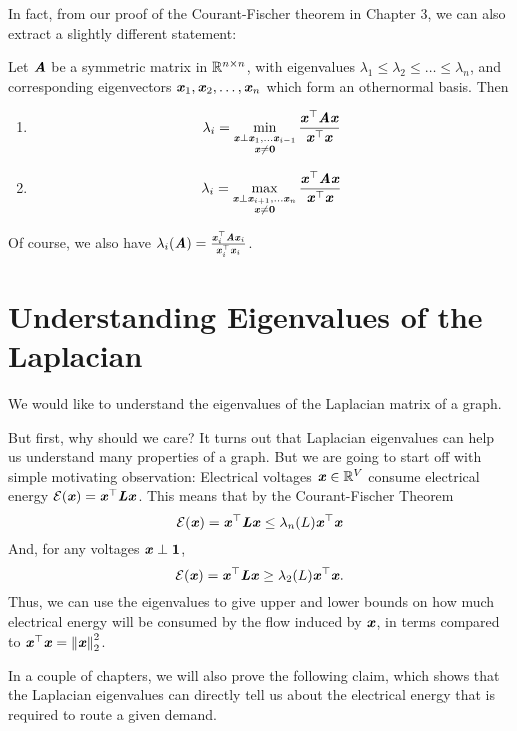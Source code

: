 In fact, from our proof of the Courant-Fischer theorem in Chapter 3,
we can also extract a slightly different statement: 

\begin{theorem}
  \label{thm:courant-fischer-eigvec}
  Let $\AA$ be a symmetric matrix in $\R^{n\times n}$, with
  eigenvalues $\lambda_1\leq \lambda_2 \leq \ldots \leq \lambda_n$,
  and corresponding eigenvectors $\xx_1, \xx_2, \ldots, \xx_n$ which
  form an othernormal basis.
  Then
  \begin{enumerate}
  \item
  \label{thm:courant-fischer-eigvec:minmax}
    \[
    \lambda_i =
    \min_{
      \substack{ \xx \perp \xx_1, \ldots \xx_{i-1}
        \\ \xx \neq \veczero}
    }
    \frac{\xx^\trp \AA\xx}{\xx^\trp\xx}
  \]
\item
  \label{thm:courant-fischer2:maxmin}
    \[
    \lambda_i =
    \max_{
      \substack{  \xx \perp \xx_{i+1}, \ldots \xx_{n}
        \\ \xx \neq \veczero}
    }
    \frac{\xx^\trp \AA\xx}{\xx^\trp\xx}
    \]
  \end{enumerate}
\end{theorem}

Of course, we also have $\lambda_i(\AA) = \frac{\xx_i ^\trp \AA \xx_i
}{\xx_i^\trp\xx_i}$.
\section{Understanding Eigenvalues of the Laplacian}
We would like to understand the eigenvalues of the Laplacian matrix of
a graph.

But first, why should we care? It turns out that Laplacian eigenvalues can help
us understand many properties of a graph.
But we are going to start off with simple motivating observation: Electrical
voltages $\xx \in \R^V$ consume electrical energy $\energy(\xx) =
\xx^{\trp} \LL \xx$.
This means that by the Courant-Fischer Theorem
\[
  \energy(\xx) =
  \xx^{\trp} \LL \xx \leq \lambda_n(L)  \xx^{\trp} \xx
\]
And, for any voltages $\xx \perp \vecone$, 
\[
  \energy(\xx) =
  \xx^{\trp} \LL \xx \geq \lambda_2(L)  \xx^{\trp} \xx.
\]
Thus, we can use the eigenvalues to give upper and lower bounds on how
much electrical energy will be consumed by the flow induced by $\xx$,
in terms compared to $\xx^{\trp} \xx = \norm{\xx}_2^2$.

In a couple of chapters, we will also prove the following claim, which
shows that the Laplacian eigenvalues can directly tell us about the
electrical energy that is required to route a given demand.

